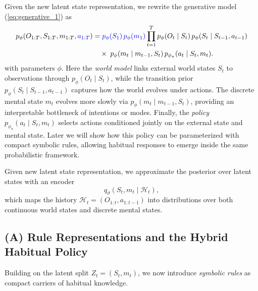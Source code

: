 \documentclass{article} %
\newcommand{\revise}[1]{\textcolor{blue}{#1}}
\begin{document}
Given the new latent state representation, we rewrite the generative model (\ref{eq:generative_1}) as
{\small
\begin{align}
p_\phi(O_{1:T}, S_{1:T}, m_{1:T}, \revise{a_{1:T}})
&= \revise{p_\phi(S_1)\, p_\phi(m_1)}
\prod_{t=1}^T 
    p_\phi(O_t \mid S_t)\,
    p_\phi(S_t \mid S_{t-1}, a_{t-1}) \notag\\
&\quad \times\;
    p_\phi(m_t \mid m_{t-1}, S_t)\,
    p_{\phi_{\pi}}(a_t \mid S_t, m_t).
\end{align}
}
with parameters \(\phi\). Here the \emph{world model} links external world states \(S_t\) to observations through \(p_\phi(O_t\mid S_t)\), while the transition prior \(p_\phi(S_t\mid S_{t-1},a_{t-1})\) captures how the world evolves under actions.  
The discrete mental state \(m_t\) evolves more slowly via \(p_\phi(m_t\mid m_{t-1},S_t)\), providing an interpretable bottleneck of intentions or modes.  
Finally, the \emph{policy} \(p_{\phi_{\pi}}(a_t\mid S_t,m_t)\) selects actions conditioned jointly on the external state and mental state. Later we will show how this policy can be parameterized with compact symbolic rules, allowing habitual responses to emerge inside the same probabilistic framework.  

Given new latent state representation, we approximate the posterior over latent states with an encoder
{\small \[
q_\vartheta(S_t,m_t\mid \mathcal H_t),
\]}
which maps the history \(\mathcal H_t=(O_{1:t},a_{1:t-1})\) into distributions over both continuous world states and discrete mental states.
\subsection{(A) Rule Representations and the Hybrid Habitual Policy}
\label{subsec:rules_policy}

Building on the latent split \(Z_t=(S_t,m_t)\), we now introduce \emph{symbolic rules} as compact carriers of habitual knowledge.  
\end{document}
